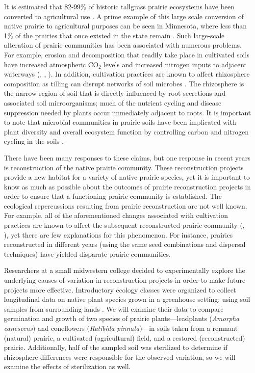 \documentclass[
]{krantz}
\begin{document}
It is estimated that 82-99\% of historic tallgrass prairie ecosystems have been converted to agricultural use \citep{Baer2002}. A prime example of this large scale conversion of native prairie to agricultural purposes can be seen in Minnesota, where less than 1\% of the prairies that once existed in the state remain \citep{Camill2004}. Such large-scale alteration of prairie communities has been associated with numerous problems. For example, erosion and decomposition that readily take place in cultivated soils have increased atmospheric \(\textrm{CO}_2\) levels and increased nitrogen inputs to adjacent waterways (\citet{Baer2002}, \citet{Camill2004}, \citet{Knops2000}). In addition, cultivation practices are known to affect rhizosphere composition as tilling can disrupt networks of soil microbes \citep{Allison2005}. The rhizosphere is the narrow region of soil that is directly influenced by root secretions and associated soil microorganisms; much of the nutrient cycling and disease suppression needed by plants occur immediately adjacent to roots. It is important to note that microbial communities in prairie soils have been implicated with plant diversity and overall ecosystem function by controlling carbon and nitrogen cycling in the soils \citep{Zak2003}.

There have been many responses to these claims, but one response in recent years is reconstruction of the native prairie community. These reconstruction projects provide a new habitat for a variety of native prairie species, yet it is important to know as much as possible about the outcomes of prairie reconstruction projects in order to ensure that a functioning prairie community is established. The ecological repercussions resulting from prairie reconstruction are not well known. For example, all of the aforementioned changes associated with cultivation practices are known to affect the subsequent reconstructed prairie community (\citet{Baer2002}, \citet{Camill2004}), yet there are few explanations for this phenomenon. For instance, prairies reconstructed in different years (using the same seed combinations and dispersal techniques) have yielded disparate prairie communities.

Researchers at a small midwestern college decided to experimentally explore the underlying causes of variation in reconstruction projects in order to make future projects more effective. Introductory ecology classes were organized to collect longitudinal data on native plant species grown in a greenhouse setting, using soil samples from surrounding lands \citep{Angell2010}. We will examine their data to compare germination and growth of two species of prairie plants---leadplants (\emph{Amorpha canescens}) and coneflowers (\emph{Ratibida pinnata})---in soils taken from a remnant (natural) prairie, a cultivated (agricultural) field, and a restored (reconstructed) prairie. Additionally, half of the sampled soil was sterilized to determine if rhizosphere differences were responsible for the observed variation, so we will examine the effects of sterilization as well.
\end{document}
